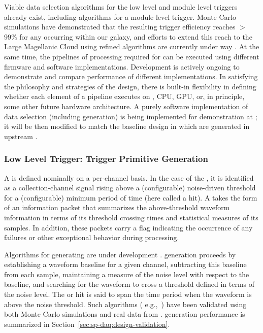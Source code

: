 Viable data selection algorithms for the low level and module level triggers already exist, including
algorithms for a module level  trigger.  Monte Carlo simulations have demonstrated that the resulting
 trigger efficiency reaches $>$99\% for any 
occurring within our galaxy, and efforts to extend this reach to the
Large Magellanic Cloud using refined algorithms are currently under way \cite{bib:docdb11215,bib:docdb14522}. At the same time, the
pipelines of processing required 
for  can be executed using different firmware and software
implementations. Development is actively ongoing to demonstrate
and compare performance of different implementations. In satisfying
the philosophy and strategies of the  design, there is built-in
flexibility in defining whether each element of a pipeline executes on
, CPU, GPU, or, in principle, some other future hardware
architecture. A purely software implementation of data selection
(including  generation) is being
implemented for demonstration at ; it will be then
modified to match the baseline design in which  are
generated in upstream  .


\subsubsection{Low Level Trigger: Trigger Primitive Generation}
\label{sec:sp-daq:design-trigger-primitives}

A  is defined nominally on a per-channel basis. In the case of
the  , it is identified as a
collection-channel signal rising above a (configurable) noise-driven
threshold for a (configurable) minimum period of time (here called a
hit).
A  takes the form of an information packet that 
summarizes the above-threshold waveform information in terms of its
threshold crossing times and statistical measures of its  samples. 
In addition, these packets carry a flag indicating the occurrence of any
failures or other exceptional behavior during  processing.


Algorithms for generating  are under development
\cite{bib:docdb11275}.   generation proceeds
by establishing a waveform baseline
for a given channel, subtracting this baseline from each sample, maintaining
a measure of the noise level with respect to the baseline, and searching for the waveform to cross a
threshold defined in terms of the noise level. 
The   or hit is said to span the time period when the waveform is above the noise threshold.
Such algorithms ( e.g.,~\cite{bib:docdb11236}) have been validated
using both Monte Carlo simulations and 
real data from . 
 generation performance is summarized in
Section~\ref{sec:sp-daq:design-validation}.

